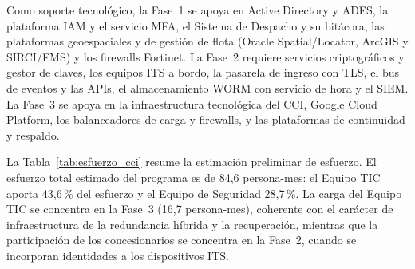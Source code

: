 Como soporte tecnológico, la Fase~1 se apoya en Active Directory y ADFS, la plataforma IAM y el servicio MFA, el Sistema de Despacho y su
bitácora, las plataformas geoespaciales y de gestión de flota (Oracle Spatial/Locator, ArcGIS y SIRCI/FMS) y los firewalls Fortinet.
La Fase~2 requiere servicios criptográficos y gestor de claves, los equipos ITS a bordo, la pasarela de ingreso con TLS, el bus de eventos
y las APIs, el almacenamiento WORM con servicio de hora y el SIEM. La Fase~3 se apoya en la infraestructura tecnológica del CCI, Google
Cloud Platform, los balanceadores de carga y firewalls, y las plataformas de continuidad y respaldo.

La Tabla~\ref{tab:esfuerzo_cci} resume la estimación preliminar de esfuerzo. El esfuerzo total estimado del programa es de 84{,}6 persona-mes: el
Equipo TIC aporta 43{,}6\,\% del esfuerzo y el Equipo de Seguridad 28{,}7\,\%. La carga del Equipo TIC se concentra en la Fase~3
    (16{,}7 persona-mes), coherente con el carácter de infraestructura de la redundancia híbrida y la recuperación, mientras que la
participación de los concesionarios se concentra en la Fase~2, cuando se incorporan identidades a los dispositivos ITS.

